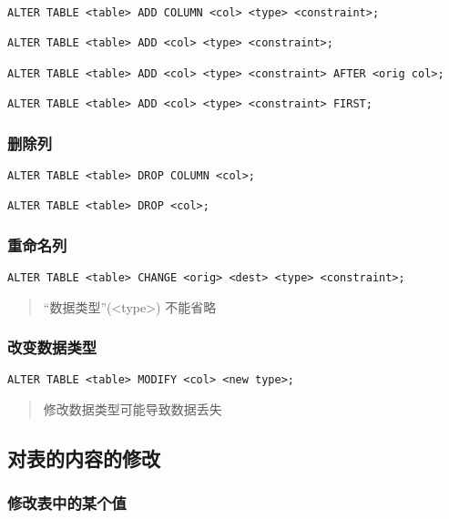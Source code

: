 \documentclass[a4paper, twoside]{article}
\begin{document}
\begin{verbatim}
ALTER TABLE <table> ADD COLUMN <col> <type> <constraint>;

ALTER TABLE <table> ADD <col> <type> <constraint>;

ALTER TABLE <table> ADD <col> <type> <constraint> AFTER <orig col>;

ALTER TABLE <table> ADD <col> <type> <constraint> FIRST;
\end{verbatim}

\subsubsection{删除列}

\begin{verbatim}
ALTER TABLE <table> DROP COLUMN <col>;

ALTER TABLE <table> DROP <col>;
\end{verbatim}

\subsubsection{重命名列}

\begin{verbatim}
ALTER TABLE <table> CHANGE <orig> <dest> <type> <constraint>;
\end{verbatim}

\begin{quote}
``数据类型''(<type>) 不能省略
\end{quote}

\subsubsection{改变数据类型}

\begin{verbatim}
ALTER TABLE <table> MODIFY <col> <new type>;
\end{verbatim}

\begin{quote}
修改数据类型可能导致数据丢失
\end{quote}

\subsection{对表的内容的修改}

\subsubsection{修改表中的某个值}
\end{document}
